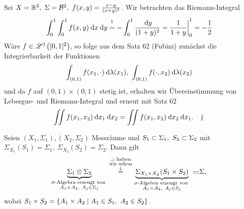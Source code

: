 \documentclass[skript.tex]{subfiles}
\begin{document}
	\setcounter{cntr}{62}
	\begin{bsp}
		Sei $X=\mathbb{R}^2,\ \Sigma = \mathcal{B}^2,\ f(x,y)=\frac{x-y}{(x+y)^3}$. Wir betrachten das Riemann-Integral
		\[
			\int_0^1 \int_0^1 f(x,y) \md x \md y \stackrel{\footnotemark}{=} - \int_0^1 \frac{\md y}{(1+y)^2} = \frac{1}{1+y} \bigg\vert_0^1 = -\frac{1}{2}
		\] 
		Wäre $f\in \mathscr{L}^1\pr{[0,1]^2}$, so folge aus dem \textup{Satz 62 (Fubini)} zunächst die Integrierbarkeit der Funktionen
		\[
			\int_{(0,1)} f(x_1,\cdot) \: \mathrm{d} \lambda(x_1),\ \int_{(0,1)} f(\cdot, x_2) \: \mathrm{d} \lambda(x_2) 
		\]
		und da $f$ auf $(0,1)\times(0,1)$ stetig ist, erhalten wir Übereinstimmung von Lebesgue- und Riemann-Integral und erneut mit \textup{Satz 62}
		\[
			\iint f(x_1, x_2) \md x_1 \md x_2 = \iint f(x_1, x_2) \md x_2 \md x_1. \quad \lightning %
		\]
	\end{bsp}
	
	\begin{lem}
		Seien $(X_1, \Sigma_1),(X_2, \Sigma_2)$ Messräume und $S_1 \subset \Sigma_1,\ S_2 \subset \Sigma_2$ mit\\ $\Sigma_{X_1}(S_1) = \Sigma_1,\ \Sigma_{X_2}(S_2) = \Sigma_2$. Dann gilt
		\[
			\underbrace{\Sigma_1 \otimes \Sigma_2}_{\substack{\sigma\text{-Algebra erzeugt von }\\ A_1\times A_2,\ A_j \in \Sigma_j}} \stackrel{\substack{\supset \text{ haben} \\ \text{wir schon} \\ \downarrow}}{=} \underbrace{\Sigma_{X_1 \times X_2}\pr{S_1 \times S_2}}_{\substack{\sigma\text{-Algebra erzeugt von }\\ A_1\times A_2,\ A_j \in S_j}}\: \mathrm{\rotatebox[origin=c]{180}{$\ceq$}} \Sigma,
		\]
		wobei $S_1 \times S_2 = \left\{A_1 \times A_2 \mid A_1 \in S_1,\ A_2 \in S_2\right\}$.
	\end{lem}
	
\end{document}
